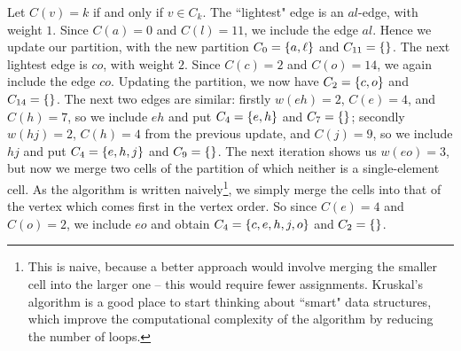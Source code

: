 \documentclass[m3380-lec-main.tex]{subfiles}
\begin{document}
\begin{exmp}
Let $C(v)=k$ if and only if $v\in C_k$. The ``lightest" edge is an $al$-edge, with weight $1$. Since $C(a)=0$ and $C(l)=11$, we include the edge $al$. Hence we update our partition, with the new partition $C_0=\left\{a,\ell\right\}$ and $C_{11}=\left\{\right\}$. 
The next lightest edge is $co$, with weight $2$. Since $C(c) = 2$ and $C(o) = 14$, we again include the edge $co$. Updating the partition, we now have $C_{2} = \left\{c,o\right\}$ and $C_{14}=\left\{\right\}$. 
The next two edges are similar: firstly $w(eh)=2$, $C(e)=4$, and $C(h)=7$, so we include $eh$ and put $C_{4}=\left\{e,h\right\}$ and $C_7=\left\{\right\}$; secondly $w(hj)=2$, $C(h) = 4$ from the previous update, and $C(j)=9$, so we include $hj$ and put $C_4 = \left\{e,h,j\right\}$ and $C_9 = \left\{\right\}$.
The next iteration shows us $w(eo)=3$, but now we merge two cells of the partition of which neither is a single-element cell. As the algorithm is written naively\footnote{This is naive, because a better approach would involve merging the smaller cell into the larger one -- this would require fewer assignments. Kruskal's algorithm is a good place to start thinking about ``smart" data structures, which improve the computational complexity of the algorithm by reducing the number of loops.}, we simply merge the cells into that of the vertex which comes first in the vertex order. So since $C(e)=4$ and $C(o)=2$, we include $eo$ and obtain $C_4=\left\{c,e,h,j,o\right\}$ and $C_2=\left\{\right\}$.


\end{exmp}
\end{document}
